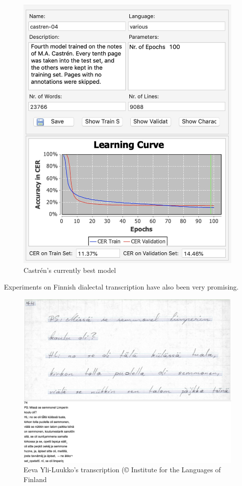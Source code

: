\documentclass[]{book}
\begin{document}
\begin{figure}
\centering
\includegraphics{images/transkribus_castren_model.jpg}
\caption{Castrén's currently best model}
\end{figure}

Experiments on Finnish dialectal transcription have also been very promising.

\begin{figure}
\centering
\includegraphics{images/transkribus_skn.jpg}
\caption{Eeva Yli-Luukko's transcription (© Institute for the Languages of Finland}
\end{figure}
\end{document}
